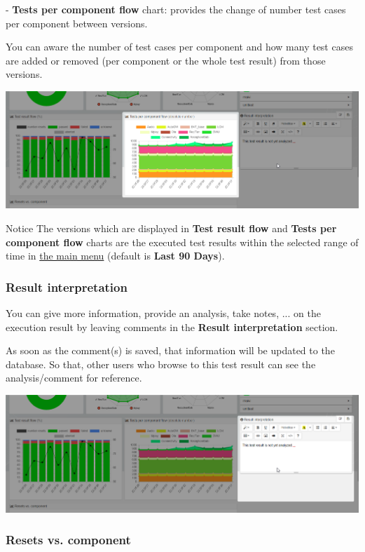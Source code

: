 - \textbf{Tests per component flow} chart: provides the change of number test
cases per component between versions.

You can aware the number of test cases per component and how many test cases are
added or removed (per component or the whole test result) from those versions.

\includegraphics[width=1\linewidth]
{./pictures/dashboard/chart_tests_per_component_flow.png}

\begin{boxhint}{Notice}
The versions which are displayed in \textbf{Test result flow} and 
\textbf{Tests per component flow} charts are the executed test results within 
the selected range of time in 
\hyperref[main-menu]{the main menu} (default is \textbf{Last 90 Days}).
\end{boxhint}

\subsubsection{Result interpretation}
You can give more information, provide an analysis, take notes, ... on the 
execution result by leaving comments in the \textbf{Result interpretation} 
section.

As soon as the comment(s) is saved, that information will be updated to 
the database. So that, other users who browse to this test result can see
the analysis/comment for reference.

\includegraphics[width=1\linewidth]
{./pictures/dashboard/result_interpretation.png}

\subsubsection{Resets vs. component}

